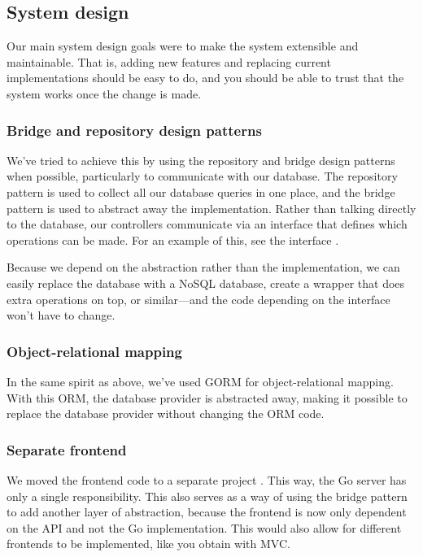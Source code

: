 \subsection{System design}
Our main system design goals were to make the system extensible and maintainable. That is, adding new features and replacing current implementations should be easy to do, and you should be able to trust that the system works once the change is made.

\subsubsection{Bridge and repository design patterns}
We've tried to achieve this by using the repository and bridge design patterns when possible, particularly to communicate with our database. The repository pattern is used to collect all our database queries in one place, and the bridge pattern is used to abstract away the implementation. Rather than talking directly to the database, our controllers communicate via an interface that defines which operations can be made. For an example of this, see the  interface \cite{repo:user-repository-interface}.

Because we depend on the abstraction rather than the implementation, we can easily replace the database with a NoSQL database, create a wrapper that does extra operations on top, or similar---and the code depending on the interface won't have to change.

\subsubsection{Object-relational mapping}
In the same spirit as above, we've used GORM \cite{gorm} for object-relational mapping. With this ORM, the database provider is abstracted away, making it possible to replace the database provider without changing the ORM code.

\subsubsection{Separate frontend}
We moved the frontend code to a separate project \cite{repo:frontend}. This way, the Go server has only a single responsibility. This also serves as a way of using the bridge pattern to add another layer of abstraction, because the frontend is now only dependent on the API and not the Go implementation. This would also allow for different frontends to be implemented, like you obtain with MVC.

